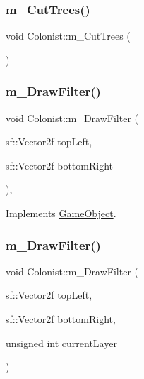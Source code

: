 \mbox{\label{class_colonist_a31ae6b8c4983b45489b77b92599fa971}} 
\subsubsection{\texorpdfstring{m\+\_\+\+Cut\+Trees()}{m\_CutTrees()}}
{\footnotesize\ttfamily void Colonist\+::m\+\_\+\+Cut\+Trees (\begin{DoxyParamCaption}{ }\end{DoxyParamCaption})}

\mbox{\label{class_colonist_a77963df06b74b1235341e235ba7b320e}} 
\subsubsection{\texorpdfstring{m\+\_\+\+Draw\+Filter()}{m\_DrawFilter()}\hspace{0.1cm}{\footnotesize\ttfamily [1/2]}}
{\footnotesize\ttfamily void Colonist\+::m\+\_\+\+Draw\+Filter (\begin{DoxyParamCaption}\item[{sf\+::\+Vector2f}]{top\+Left,  }\item[{sf\+::\+Vector2f}]{bottom\+Right }\end{DoxyParamCaption})\hspace{0.3cm}{\ttfamily [override]}, {\ttfamily [virtual]}}



Implements \mbox{\hyperlink{class_game_object_af1a0662ca445d878b163c4648f90259c}{Game\+Object}}.

\mbox{\label{class_colonist_a2cdc11f7d868611172ed36f67ea1393f}} 
\subsubsection{\texorpdfstring{m\+\_\+\+Draw\+Filter()}{m\_DrawFilter()}\hspace{0.1cm}{\footnotesize\ttfamily [2/2]}}
{\footnotesize\ttfamily void Colonist\+::m\+\_\+\+Draw\+Filter (\begin{DoxyParamCaption}\item[{sf\+::\+Vector2f}]{top\+Left,  }\item[{sf\+::\+Vector2f}]{bottom\+Right,  }\item[{unsigned int}]{current\+Layer }\end{DoxyParamCaption})}

